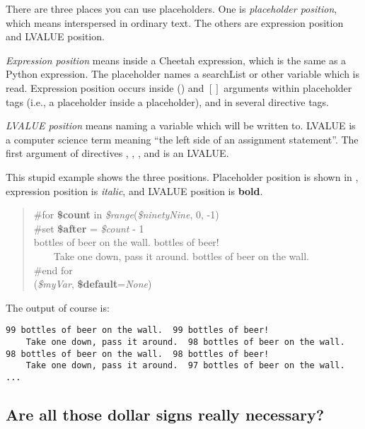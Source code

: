 There are three places you can use placeholders.  One is {\em placeholder
position}, which means interspersed in ordinary text.  The others are expression
position and LVALUE position.

{\em Expression position} means inside a Cheetah expression, which is the same
as a Python expression.  The placeholder names a searchList or other variable
which is read.  Expression position occurs inside () and $[]$ arguments within
placeholder tags (i.e., a placeholder inside a placeholder), and in several
directive tags.

{\em LVALUE position} means naming a variable which will be written to.  LVALUE
is a computer science term meaning ``the left side of an assignment 
statement''.  The first argument of directives , ,
,  and  is an LVALUE.

This stupid example shows the three positions.  Placeholder position is shown
in , expression position is {\em italic}, and LVALUE position is
{\bf bold}.

\begin{quote}
\#for {\bf \$count} in {\em \$range}({\em \$ninetyNine}, 0, -1)\\
\#set {\bf \$after} = {\em \$count} - 1\\
 bottles of beer on the wall.   bottles of beer!\\
~~~~Take one down, pass it around.   bottles of beer on the wall.\\
\#end for\\
({\em \$myVar}, {\bf \$default}={\em None})
\end{quote}

The output of course is:
\begin{verbatim}
99 bottles of beer on the wall.  99 bottles of beer!
    Take one down, pass it around.  98 bottles of beer on the wall.
98 bottles of beer on the wall.  98 bottles of beer!
    Take one down, pass it around.  97 bottles of beer on the wall.
...
\end{verbatim}


\subsection{Are all those dollar signs really necessary?}
\label{language.placeholders.dollar-signs}


